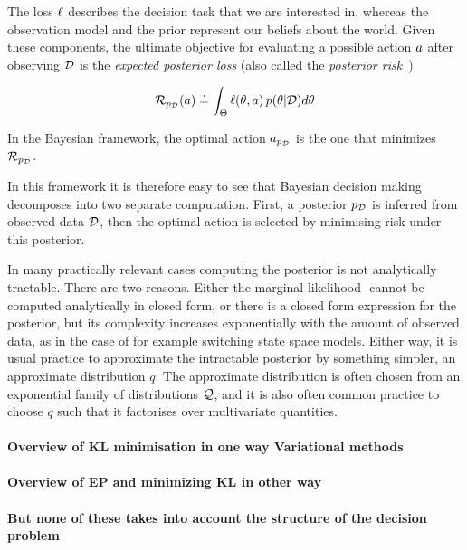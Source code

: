 The loss $\ell$ describes the decision task that we are interested in, whereas the observation model and the prior represent our beliefs about the world. Given these components, the ultimate objective for evaluating a possible action $a$ after observing $\mathcal{D}$ is the \emph{expected posterior loss} (also called the \emph{posterior risk}~\cite{schervish95theory})

\begin{equation}
	\mathcal{R}_{p_{\mathcal{D}}}(a) \doteq \int_\Theta \ell(\theta, a) \, p(\theta|\mathcal{D}) d\theta
\end{equation}

In the Bayesian framework, the optimal action $a_{p_{\mathcal{D}}}$ is the one that minimizes $\mathcal{R}_{p_{\mathcal{D}}}$.



In this framework it is therefore easy to see that Bayesian decision making decomposes into two separate computation. First, a posterior $p_{\mathcal{D}}$ is inferred from observed data $\mathcal{D}$, then the optimal action is selected by minimising risk under this posterior.

In many practically relevant cases computing the posterior is not analytically tractable. There are two reasons. Either the marginal likelihood $ $
cannot be computed analytically in closed form, or there is a closed form expression for the posterior, but its complexity increases exponentially with the amount of observed data, as in the case of for example switching state space models. Either way, it is usual practice to approximate the intractable posterior by something simpler, an approximate distribution $q$. The approximate distribution is often chosen from an exponential family of distributions $\mathcal{Q}$, and it is also often common practice to choose $q$ such that it factorises over multivariate quantities.

\paragraph{Overview of KL minimisation in one way Variational methods}

\paragraph{Overview of EP and minimizing KL in other way}

\paragraph{But none of these takes into account the structure of the decision problem}

